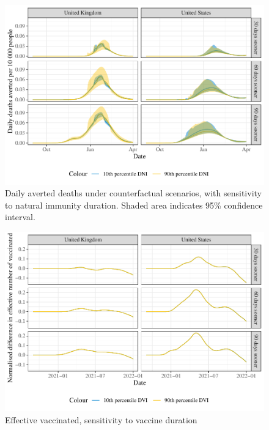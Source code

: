 \documentclass{article}
\begin{document}
\begin{figure}[H]

{\centering \includegraphics[height=0.35\textheight,]{_main_files/figure-latex/deaths-averted-plot-durR-1}

}

\caption{Daily averted deaths under counterfactual scenarios, with sensitivity to natural immunity duration. Shaded area indicates 95\% confidence interval.}\label{fig:deaths-averted-plot-durR}
\end{figure}
\begin{figure}[H]

{\centering \includegraphics[height=0.35\textheight,]{_main_files/figure-latex/vaccinated-plot-vei-1}

}

\caption{Effective vaccinated, sensitivity to vaccine duration}\label{fig:vaccinated-plot-vei}
\end{figure}


\end{document}
